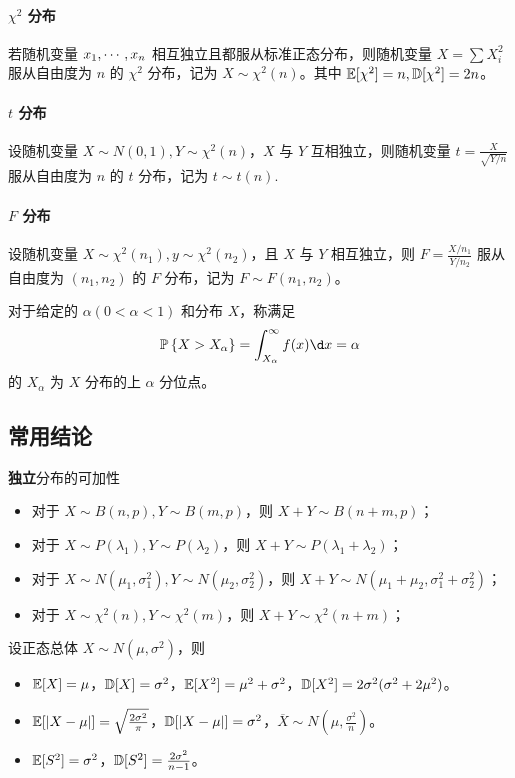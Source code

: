 \paragraph{$\chi^2$ 分布}

若随机变量 $x_1,\cdots,x_n$ 相互独立且都服从标准正态分布，则随机变量 $X = \sum X_i^2$ 服从自由度为 $n$ 的 $\chi^2$ 分布，记为 $X \sim \chi^2(n)$。其中 $\mathbb{E}[\chi^2] = n, \mathbb{D}[\chi^2] = 2n$。


\paragraph{$t$ 分布}

设随机变量 $X \sim N(0, 1), Y \sim \chi^2(n)$，$X$ 与 $Y$ 互相独立，则随机变量 $t = \frac{X}{\sqrt{Y / n}}$ 服从自由度为 $n$ 的 $t$ 分布，记为 $t \sim t(n)$.

\paragraph{$F$ 分布}

设随机变量 $X \sim \chi^2(n_1), y \sim \chi^2(n_2)$，且 $X$ 与 $Y$ 相互独立，则 $F = \frac{X / n_1}{Y / n_2}$ 服从自由度为 $(n_1, n_2)$ 的 $F$ 分布，记为 $F \sim F(n_1, n_2)$。

对于给定的 $\alpha(0 < \alpha < 1)$ 和分布 $X$，称满足
\[ \bbP\left\{X > X_\alpha\right\} = \int_{X_\alpha}^{\infty} f(x) \d x = \alpha  \]
的 $X_\alpha$ 为 $X$ 分布的上 $\alpha$ 分位点。

\subsection{常用结论}

\textbf{独立}分布的可加性
\begin{itemize}
	\item 对于 $X \sim B(n,p), Y \sim B(m, p)$，则 $X+Y \sim B(n+m,p)$；
	\item 对于 $X \sim P(\lambda_1), Y \sim P(\lambda_2)$，则 $X+Y \sim P(\lambda_1 + \lambda_2)$；
	\item 对于 $X \sim N(\mu_1, \sigma_1^2), Y \sim N(\mu_2, \sigma_2^2)$，则 $X+Y \sim N(\mu_1+\mu_2, \sigma_1^2+\sigma_2^2)$；
	\item 对于 $X \sim \chi^2(n), Y \sim \chi^2(m)$，则 $X+Y \sim \chi^2(n+m)$；
\end{itemize}

设正态总体 $X \sim N(\mu, \sigma^2)$，则
\begin{itemize}
	\item $\mathbb{E}[X] = \mu$，$\mathbb{D}[X] = \sigma^2$，$\mathbb{E}[X^2] = \mu^2+\sigma^2$，$\mathbb{D}[X^2] = 2 \sigma^2(\sigma^2 + 2\mu^2)$。
	\item $\mathbb{E}[|X - \mu|] = \sqrt{\frac{2 \sigma^2}{\pi}}$，$\mathbb{D}[|X - \mu|] = \sigma^2$，$\overline{X} \sim N\left(\mu, \frac{\sigma^2}{n}\right)$。
	\item $\mathbb{E}[S^2] = \sigma^2$，$\mathbb{D}[S^2] = \frac{2 \sigma^2}{n - 1}$。
\end{itemize}

